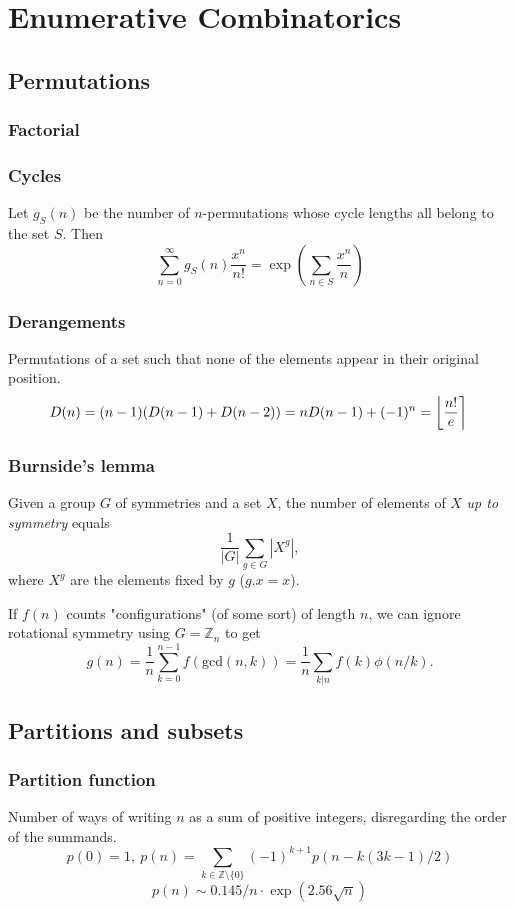 \chapter{Enumerative Combinatorics}

\section{Permutations}
\subsection{Factorial}


\subsection{Cycles}
Let $g_S(n)$ be the number of $n$-permutations whose cycle lengths all belong to the set $S$. Then
\small
$$\sum_{n=0} ^\infty g_S(n) \frac{x^n}{n!} = \exp\left(\sum_{n\in S} \frac{x^n} {n} \right)$$
\normalsize

\subsection{Derangements}
Permutations of a set such that none of the elements appear in their original position.
\small
\[ \mkern-2mu D(n) = (n-1)(D(n-1)+D(n-2)) = n D(n-1)+(-1)^n = \left\lfloor\frac{n!}{e}\right\rceil \]
\normalsize

\subsection{Burnside's lemma}
Given a group $G$ of symmetries and a set $X$, the number of elements of $X$ \emph{up to symmetry} equals
\small
\[ {\frac {1}{|G|}}\sum _{{g\in G}}|X^{g}|, \]
\normalsize
where $X^{g}$ are the elements fixed by $g$ ($g.x = x$).

If $f(n)$ counts "configurations" (of some sort) of length $n$, we can ignore rotational symmetry using $G = \mathbb Z_n$ to get
\small
\[ g(n) = \frac 1 n \sum_{k=0}^{n-1}{f(\text{gcd}(n, k))} = \frac 1 n \sum_{k|n}{f(k)\phi(n/k)}. \]
\normalsize

\section{Partitions and subsets}
\subsection{Partition function}
Number of ways of writing $n$ as a sum of positive integers, disregarding the order of the summands.
\small
\[ p(0) = 1,\ p(n) = \sum_{k \in \mathbb Z \setminus \{0\}}{(-1)^{k+1} p(n - k(3k-1) / 2)} \]
\[ p(n) \sim 0.145 / n \cdot \exp(2.56 \sqrt{n}) \]


